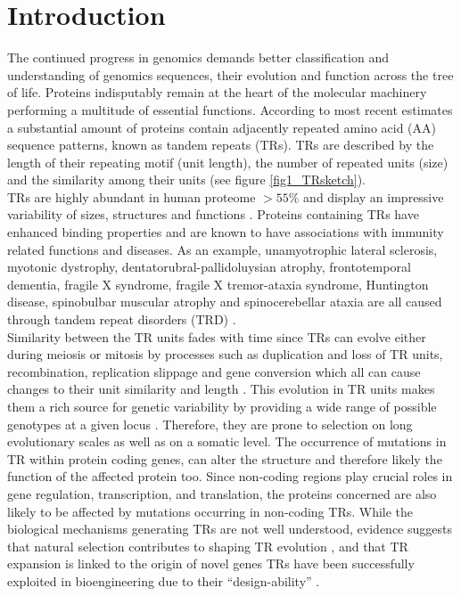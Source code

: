 \documentclass[a4,center,fleqn]{NAR}
\begin{document}
\section{Introduction}
The continued progress in genomics demands better classification and understanding of genomics sequences, their evolution and function across the tree of life. 
Proteins indisputably remain at the heart of the molecular machinery performing a multitude of essential functions. 
According to most recent estimates a substantial amount of proteins contain adjacently repeated amino acid (AA) sequence patterns, known as tandem repeats (TRs).  
TRs are described by the length of their repeating motif (unit length), the number of repeated units (size) and the similarity among their units \cite{Schaper2015} (see figure \ref{fig1_TRsketch}). \\
TRs are highly abundant in human proteome $>55\%$ \cite{Rollins2005} and display an impressive variability of sizes, structures and functions \cite{Schaper2012, Schaper2014}. 
Proteins containing TRs have enhanced binding properties \cite{Li2003} and are known to have associations with immunity related functions \cite{Usdin2008, Madsen2008} and diseases.
As an example, unamyotrophic lateral sclerosis, myotonic dystrophy, dentatorubral-pallidoluysian atrophy, frontotemporal dementia, fragile X syndrome, fragile X tremor-ataxia syndrome, Huntington disease, spinobulbar muscular atrophy and spinocerebellar ataxia are all caused through tandem repeat disorders (TRD) \cite{Hannan2018}. \\
\enlargethispage{-65.1pt}
Similarity between the TR units fades with time since TRs can evolve either during meiosis or mitosis by processes such as duplication and loss of TR units, recombination, replication slippage and gene conversion which all can cause changes to their unit similarity and length \cite{Ellegren2004}. This evolution in TR units makes them a rich source for genetic variability by providing a wide range of possible genotypes at a given locus \cite{Nithianantharajah2007}. Therefore, they are prone to selection on long evolutionary scales as well as on a somatic level. The occurrence of mutations in TR within protein coding genes, can alter the structure and therefore likely the function of the affected protein too. Since non-coding regions play crucial roles in gene regulation, transcription, and translation, the proteins concerned are also likely to be affected by mutations occurring in non-coding TRs.
While the biological mechanisms generating TRs are not well understood, evidence suggests that natural selection contributes to shaping TR evolution \cite{Schaper2014},
and that TR expansion is linked to the origin of novel genes \cite{Light2014}
TRs have been successfully exploited in bioengineering due to their “design-ability” \cite{Javadi2013}.
\end{document}
